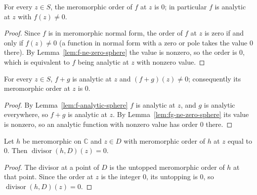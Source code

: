 \begin{lemma}
    \label{lem:f-analytic-sphere}
    \leanok
    For every $z \in S$, the meromorphic order of $f$ at $z$ is $0$; in
    particular $f$ is analytic at $z$ with $f(z) \neq 0$.
\end{lemma}
\begin{proof}
    Since $f$ is in meromorphic normal form, the order of $f$ at $z$ is zero if
    and only if $f(z) \neq 0$ (a function in normal form with a zero or pole
    takes the value $0$ there). By Lemma~\ref{lem:f-ne-zero-sphere} the value is
    nonzero, so the order is $0$, which is equivalent to $f$ being analytic at
    $z$ with nonzero value.
\end{proof}

\begin{lemma}
    \label{lem:fg-analytic-sphere}
    \leanok
    For every $z \in S$, $f+g$ is analytic at $z$ and $(f+g)(z) \neq 0$;
    consequently its meromorphic order at $z$ is $0$.
\end{lemma}
\begin{proof}
    By Lemma~\ref{lem:f-analytic-sphere} $f$ is analytic at $z$, and $g$ is
    analytic everywhere, so $f+g$ is analytic at $z$. By
    Lemma~\ref{lem:fg-ne-zero-sphere} its value is nonzero, so an analytic
    function with nonzero value has order $0$ there.
\end{proof}

\begin{lemma}
    \label{lem:divisor-eq-zero-of-orderZero}
    \leanok
    Let $h$ be meromorphic on $\mathbb{C}$ and $z \in D$ with meromorphic order
    of $h$ at $z$ equal to $0$. Then $\operatorname{divisor}(h,D)(z) = 0$.
\end{lemma}
\begin{proof}
    The divisor at a point of $D$ is the untopped meromorphic order of $h$ at
    that point. Since the order at $z$ is the integer $0$, its untopping is $0$,
    so $\operatorname{divisor}(h,D)(z) = 0$.
\end{proof}

